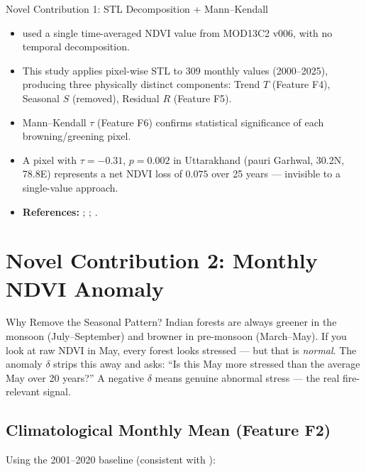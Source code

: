 \documentclass[12pt, a4paper]{article}
\begin{document}
\begin{novelbox}{Novel Contribution 1: STL Decomposition + Mann--Kendall}
\begin{itemize}[leftmargin=1.5em,itemsep=2pt]
  \item \citet{biswas2025} used a single time-averaged NDVI value
        from MOD13C2 v006, with no temporal decomposition.
  \item This study applies pixel-wise STL to 309 monthly values
        (2000--2025), producing three physically distinct components:
        Trend $T$ (Feature F4), Seasonal $S$ (removed), Residual $R$
        (Feature F5).
  \item Mann--Kendall $\tau$ (Feature F6) confirms statistical
        significance of each browning/greening pixel.
  \item A pixel with $\tau = -0.31$, $p = 0.002$ in Uttarakhand
        (pauri Garhwal, 30.2\textdegree N, 78.8\textdegree E)
        represents a net NDVI loss of $0.075$ over 25 years ---
        invisible to a single-value approach.
  \item \textbf{References:} \citet{cleveland1990stl};
        \citet{mann1945}; \citet{kendall1975}.
\end{itemize}
\end{novelbox}

\section{Novel Contribution 2: Monthly NDVI Anomaly}
\label{sec:anomaly}

\begin{simplebox}{Why Remove the Seasonal Pattern?}
Indian forests are always greener in the monsoon (July--September)
and browner in pre-monsoon (March--May). If you look at raw NDVI in
May, every forest looks stressed --- but that is \emph{normal}.
The anomaly $\delta$ strips this away and asks:
``Is this May more stressed than the average May over 20 years?''
A negative $\delta$ means genuine abnormal stress --- the real
fire-relevant signal.
\end{simplebox}

\subsection{Climatological Monthly Mean (Feature F2)}

Using the 2001--2020 baseline (consistent with \citealt{biswas2025}):
\end{document}
